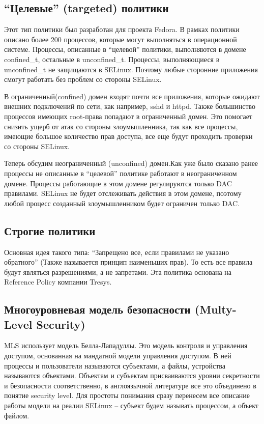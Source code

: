 \documentclass{article}
\begin{document}
\subsection{“Целевые” (targeted) политики}

Этот тип политики был разработан для проекта Fedora. В рамках политики описано более 200 процессов, которые могут выполняться в операционной системе. Процессы, описанные в “целевой” политики, выполняются в домене confined\_t, остальные в unconfined\_t. Процессы, выполняющиеся в unconfined\_t не защищаются в SELinux. Поэтому любые сторонние приложения смогут работать без проблем со стороны SELinux.


В ограниченный(confined) домен входят почти все приложения, которые ожидают внешних подключений по сети, как например, sshd и httpd. Также большинство процессов имеющих root-права попадают в ограниченный домен. Это помогает снизить ущерб от атак со стороны злоумышленника, так как все процессы, имеющие большое количество прав доступа, все еще будут проходить проверки со стороны SELinux.

Теперь обсудим неограниченный (unconfined) домен.Как уже было сказано ранее процессы не описанные в “целевой” политике работают в неограниченном домене. Процессы работающие в этом домене регулируются только DAC правилами. SELinux не будет отслеживать действия в этом домене, поэтому любой процесс созданный злоумышленником будет ограничен только DAC.

\subsection{Строгие политики}

Основная идея такого типа: “Запрещено все, если правилами не указано обратного” (Также называется принцип наименьших прав). То есть все правила будут являться разрешениями, а не запретами. Эта политика основана на Reference Policy компании Tresys.
\subsection{Многоуровневая модель безопасности (Multy-Level Security)}
MLS использует модель Белла-Лападуллы. Это модель контроля и управления доступом, основанная на мандатной модели управления доступом. В ней процессы и пользователи называются субъектами, а файлы, устройства называются объектами. Объектам и субъектам присваиваются уровни секретности и безопасности соответственно, в англоязычной литературе все это объединено в понятие security level. Для простоты понимания сразу перенесем все описание работы модели на реалии SELinux – субъект будем называть процессом, а объект файлом.
\end{document}
